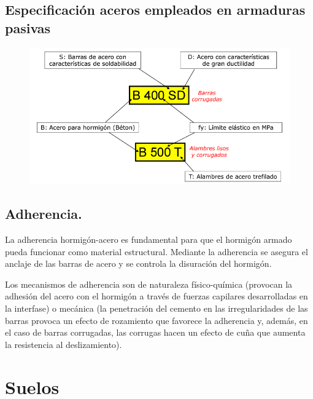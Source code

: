 \subsection{Especificación aceros empleados en armaduras pasivas}

\begin{figure}[H]
    \centering
    \includegraphics[width = 0.5 \textwidth]{Imagenes/Especificacion aceros empleados en armaduras pasivas.png}
\end{figure}

\subsection{Adherencia.}
La adherencia hormigón-acero es fundamental para que el hormigón armado pueda funcionar como material estructural. Mediante la adherencia se asegura el anclaje de las barras de acero y se controla la disuración del hormigón.

Los mecanismos de adherencia son de naturaleza físico-química (provocan la adhesión del acero con el hormigón a través de fuerzas capilares desarrolladas en la interfase) o mecánica (la penetración del cemento en las irregularidades de las barras provoca un efecto de rozamiento que favorece la adherencia y, además, en el caso de barras corrugadas, las corrugas hacen un efecto de cuña que aumenta la resistencia al deslizamiento).


\section{Suelos}
